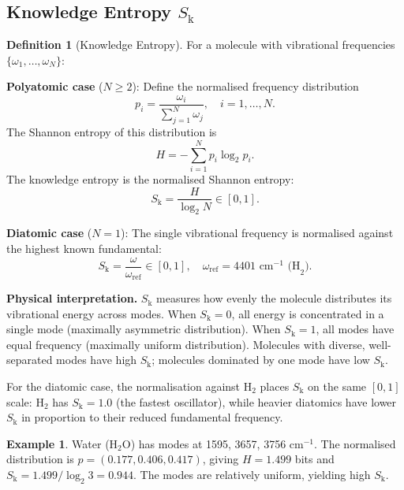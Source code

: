 \documentclass[11pt,a4paper]{article}
\theoremstyle{definition}
\newtheorem{definition}[theorem]{Definition}
\newtheorem{example}[theorem]{Example}
\theoremstyle{remark}
\newcommand{\Sk}{S_{\mathrm{k}}}
\begin{document}
\subsection{Knowledge Entropy \texorpdfstring{$\Sk$}{S\_k}}

\begin{definition}[Knowledge Entropy]
\label{def:s_k}
For a molecule with vibrational frequencies $\{\omega_1, \ldots, \omega_N\}$:

\textbf{Polyatomic case} ($N \geq 2$): Define the normalised frequency distribution
\begin{equation}
p_i = \frac{\omega_i}{\sum_{j=1}^{N} \omega_j}, \quad i = 1, \ldots, N.
\label{eq:frequency_distribution}
\end{equation}
The Shannon entropy \citep{shannon1948} of this distribution is
\begin{equation}
H = -\sum_{i=1}^{N} p_i \log_2 p_i.
\label{eq:shannon}
\end{equation}
The knowledge entropy is the normalised Shannon entropy:
\begin{equation}
\Sk = \frac{H}{\log_2 N} \in [0, 1].
\label{eq:s_k_poly}
\end{equation}

\textbf{Diatomic case} ($N = 1$): The single vibrational frequency is normalised against the highest known fundamental:
\begin{equation}
\Sk = \frac{\omega}{\omega_{\mathrm{ref}}} \in [0, 1], \quad \omega_{\mathrm{ref}} = 4401 \text{ cm}^{-1} \text{ (H}_2\text{)}.
\label{eq:s_k_diatomic}
\end{equation}
\end{definition}

\textbf{Physical interpretation.} $\Sk$ measures how evenly the molecule distributes its vibrational energy across modes. When $\Sk = 0$, all energy is concentrated in a single mode (maximally asymmetric distribution). When $\Sk = 1$, all modes have equal frequency (maximally uniform distribution). Molecules with diverse, well-separated modes have high $\Sk$; molecules dominated by one mode have low $\Sk$.

For the diatomic case, the normalisation against H$_2$ places $\Sk$ on the same $[0,1]$ scale: H$_2$ has $\Sk = 1.0$ (the fastest oscillator), while heavier diatomics have lower $\Sk$ in proportion to their reduced fundamental frequency.

\begin{example}
Water (H$_2$O) has modes at 1595, 3657, 3756 cm$^{-1}$. The normalised distribution is $p = (0.177, 0.406, 0.417)$, giving $H = 1.499$ bits and $\Sk = 1.499/\log_2 3 = 0.944$. The modes are relatively uniform, yielding high $\Sk$.
\end{example}
\end{document}
